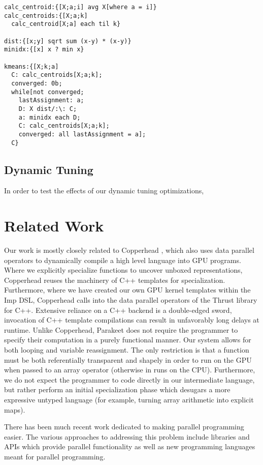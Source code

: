 \documentclass[preprint]{sigplanconf}
\begin{document}
\begin{lstlisting}[caption=K-Means Clustering implemented in Q]
calc_centroid:{[X;a;i] avg X[where a = i]}
calc_centroids:{[X;a;k] 
  calc_centroid[X;a] each til k}
  
dist:{[x;y] sqrt sum (x-y) * (x-y)}
minidx:{[x] x ? min x}

kmeans:{[X;k;a]
  C: calc_centroids[X;a;k];
  converged: 0b;
  while[not converged;
    lastAssignment: a;
    D: X dist/:\: C;
    a: minidx each D;
    C: calc_centroids[X;a;k];
    converged: all lastAssignment = a];
  C}
\end{lstlisting}
\label{QKMeans}

\subsection{Dynamic Tuning}
In order to test the effects of our dynamic tuning optimizations, 

\section{Related Work}
\label{RelatedWork}

Our work is mostly closely related to Copperhead \cite{Cata10}, which also uses data parallel operators to dynamically compile a high level language into GPU programs. Where we explicitly specialize functions to uncover unboxed representations, Copperhead reuses the machinery of C++ templates for specialization. Furthermore, where we have created our own GPU kernel templates within the Imp DSL, Copperhead calls into the data parallel operators of the Thrust library for C++. Extensive reliance on a C++ backend is a double-edged sword, invocation of C++ template compilations can result in unfavorably long delays at runtime. Unlike Copperhead, Parakeet does not require the programmer to specify their computation in a purely functional manner. Our system allows for both looping and variable reassignment. The only restriction is that a function must be both referentially transparent and shapely in order to run on the GPU when passed to an array operator (otherwise in runs on the CPU). Furthermore, we do not expect the programmer to code directly in our intermediate language, but rather perform an initial specialization phase which desugars a more expressive untyped language (for example, turning array arithmetic into explicit maps). 

There has been much recent work dedicated to making parallel programming easier.
The various approaches to addressing this problem include libraries and APIs
which provide parallel functionality as well as new programming languages meant
for parallel programming.
\end{document}
